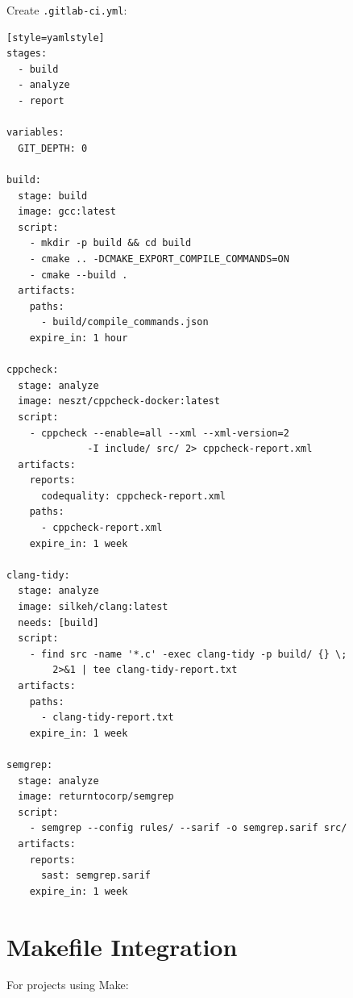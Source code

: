 \documentclass[11pt,letterpaper]{report}
\begin{document}
Create \texttt{.gitlab-ci.yml}:

\begin{verbatim}[style=yamlstyle]
stages:
  - build
  - analyze
  - report

variables:
  GIT_DEPTH: 0

build:
  stage: build
  image: gcc:latest
  script:
    - mkdir -p build && cd build
    - cmake .. -DCMAKE_EXPORT_COMPILE_COMMANDS=ON
    - cmake --build .
  artifacts:
    paths:
      - build/compile_commands.json
    expire_in: 1 hour

cppcheck:
  stage: analyze
  image: neszt/cppcheck-docker:latest
  script:
    - cppcheck --enable=all --xml --xml-version=2
              -I include/ src/ 2> cppcheck-report.xml
  artifacts:
    reports:
      codequality: cppcheck-report.xml
    paths:
      - cppcheck-report.xml
    expire_in: 1 week

clang-tidy:
  stage: analyze
  image: silkeh/clang:latest
  needs: [build]
  script:
    - find src -name '*.c' -exec clang-tidy -p build/ {} \;
        2>&1 | tee clang-tidy-report.txt
  artifacts:
    paths:
      - clang-tidy-report.txt
    expire_in: 1 week

semgrep:
  stage: analyze
  image: returntocorp/semgrep
  script:
    - semgrep --config rules/ --sarif -o semgrep.sarif src/
  artifacts:
    reports:
      sast: semgrep.sarif
    expire_in: 1 week
\end{verbatim}

\section{Makefile Integration}

For projects using Make:
\end{document}
